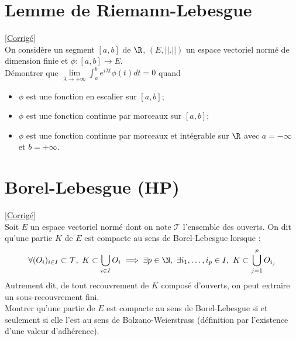 \documentclass{book}
\begin{document}
\section{Lemme de Riemann-Lebesgue }
\label{Lemme de Riemann-Lebesgue}
\textcolor{blue}{\hyperref[sec:lemme-de-riemann-lebesgue-etoile3]{[Corrigé]}}\\
On considère un segment $[a,b]$ de $\R$, $(E,||.||)$ un espace vectoriel normé de dimension finie et $\phi:[a,b]\to E$.
\\Démontrer que $\lim\limits_{\lambda \to+\infty} \displaystyle\int_a^b e^{i\lambda t}\phi(t)dt=0$ quand
\begin{itemize}
	\item $\phi$ est une fonction en escalier sur $[a,b]$;
	\item $\phi$ est une fonction continue par morceaux sur $[a,b]$;
	\item $\phi$ est une fonction continue par morceaux et intégrable sur $\R$ avec $a=-\infty$ et $b=+\infty$.
\end{itemize}

\section{Borel-Lebesgue (HP)}
\label{Borel-Lebesgue}
\textcolor{blue}{\hyperref[sec:borel-lebesgue]{[Corrigé]}}\\
Soit $E$ un espace vectoriel normé dont on note $\mathcal T$ l'ensemble des ouverts. On dit qu'une partie $K$ de $E$ est compacte au sens de Borel-Lebesgue lorsque :
$$\forall (O_i)_{i\in I}\subset \mathcal T,\ K\subset \bigcup_{i\in I}O_i\implies \exists p\in \N,\ \exists i_1,\dots,i_p\in I,\ K\subset \bigcup_{j=1}^pO_{i_j}$$
Autrement dit, de tout recouvrement de $K$ composé d'ouverts, on peut extraire un sous-recouvrement fini.\\
Montrer qu'une partie de $E$ est compacte au sens de Borel-Lebesgue si et seulement si elle l'est au sens de Bolzano-Weierstrass (définition par l'existence d'une valeur d'adhérence).\\\\
\end{document}
